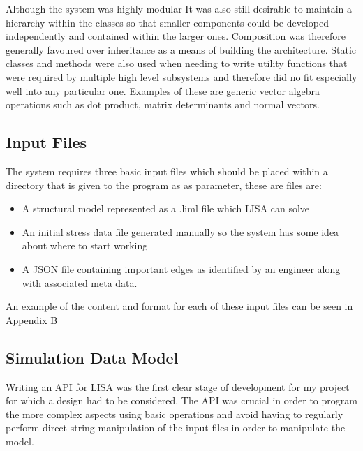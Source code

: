\noindent
Although the system was highly modular It was also still desirable to maintain a hierarchy within the classes so that smaller components could be developed independently and contained within the larger ones. Composition was therefore generally favoured over inheritance as a means of building the architecture. Static classes and methods were also used when needing to write utility functions that were required by multiple high level subsystems and therefore did no fit especially well into any particular one. Examples of these are generic vector algebra operations such as dot product, matrix determinants and normal vectors.



\subsection{Input Files}
The system requires three basic input files which should be placed within a directory that is given to the program as as parameter, these are files are:

\begin{itemize}
\item A structural model represented as a .liml file which LISA can solve
\item An initial stress data file generated manually so the system has some idea about where to start working
\item A JSON file containing important edges as identified by an engineer 
along with associated meta data.
\end{itemize}

An example of the content and format for each of these input files can be seen in Appendix B

\subsection{Simulation Data Model}
Writing an API for LISA was the first clear stage of development for my project for which a design had to be considered. The API was crucial in order to program the more complex aspects using basic operations and avoid having to regularly perform direct string manipulation of the input files in order to manipulate the model. \\

